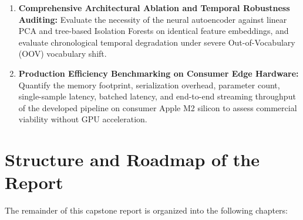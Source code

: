 \begin{enumerate}
    \item \textbf{Comprehensive Architectural Ablation and Temporal Robustness Auditing:} Evaluate the necessity of the neural autoencoder against linear PCA and tree-based Isolation Forests on identical feature embeddings, and evaluate chronological temporal degradation under severe Out-of-Vocabulary (OOV) vocabulary shift.
    \item \textbf{Production Efficiency Benchmarking on Consumer Edge Hardware:} Quantify the memory footprint, serialization overhead, parameter count, single-sample latency, batched latency, and end-to-end streaming throughput of the developed pipeline on consumer Apple M2 silicon to assess commercial viability without GPU acceleration.
\end{enumerate}

\section{Structure and Roadmap of the Report}
\label{sec:intro_roadmap}
The remainder of this capstone report is organized into the following chapters:

